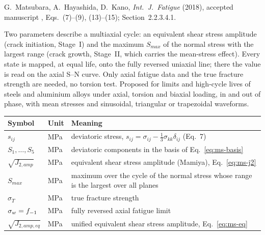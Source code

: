 \label{sheet:MATSUBARA}

 G.~Matsubara, A.~Hayashida, D.~Kano, \emph{Int.\ J.\ Fatigue} (2018), accepted
manuscript \cite{matsubara2018}, Eqs.~(7)--(9), (13)--(15); Section~2.2.3.4.1.

 Two parameters describe a multiaxial cycle: an equivalent shear stress
amplitude (crack initiation, Stage~I) and the maximum $S_{max}$ of the normal stress with the
largest range (crack growth, Stage~II, which carries the mean-stress effect). Every state is mapped,
at equal life, onto the fully reversed uniaxial line; there the value is read on the axial S--N
curve. Only axial fatigue data and the true fracture strength are needed, no torsion test.
Proposed for limits and high-cycle lives of steels and aluminium alloys under axial, torsion and
biaxial loading, in and out of phase, with mean stresses and sinusoidal, triangular or trapezoidal
waveforms.

\begin{center}\small
\begin{tabular}{@{}llp{100mm}@{}}
\toprule
Symbol & Unit & Meaning\\\midrule
$s_{ij}$ & MPa & deviatoric stress, $s_{ij}=\sigma_{ij}-\tfrac13\sigma_{kk}\delta_{ij}$ (Eq.~7)\\
$S_1,\dots,S_5$ & MPa & deviatoric components in the basis of Eq.~\eqref{eq:ms-basis}\\
$\sqrt{J_{2,amp}}$ & MPa & equivalent shear stress amplitude (Mamiya), Eq.~\eqref{eq:ms-j2}\\
$S_{max}$ & MPa & maximum over the cycle of the normal stress whose range is the largest over all planes\\
$\sigma_T$ & MPa & true fracture strength\\
$\sigma_w=f_{-1}$ & MPa & fully reversed axial fatigue limit\\
$\sqrt{J_{2,amp,eq}}$ & MPa & unified equivalent shear stress amplitude, Eq.~\eqref{eq:ms-eq}\\
\bottomrule
\end{tabular}
\end{center}

